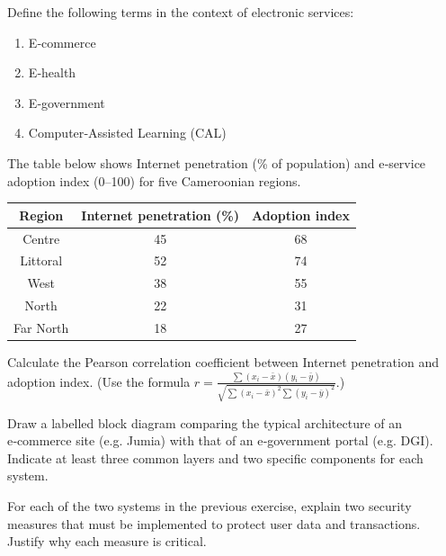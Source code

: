 \documentclass[11pt]{article}
\newcounter{popsec}
\newcounter{popsub}
\newcommand{\courssub}[1]{%
  \stepcounter{popsub}%
  \par\vspace{9pt}\noindent{\popxbold\fontsize{11.5}{13}\selectfont\color{popink}{\color{poporange}\thepopsec.\thepopsub}\hspace{6pt}#1}\par\nopagebreak\vspace{4pt}
}
\begin{document}
\begin{exercice}[Definitions]
Define the following terms in the context of electronic services:
\begin{enumerate}
\item E‑commerce
\item E‑health
\item E‑government
\item Computer‑Assisted Learning (CAL)
\end{enumerate}
\end{exercice}

\begin{exercice}
The table below shows Internet penetration (\% of population) and e‑service adoption index (0–100) for five Cameroonian regions.

\begin{center}
\begin{tabular}{|c|c|c|}\hline
Region & Internet penetration (\%) & Adoption index \\ \hline
Centre & 45 & 68 \\ \hline
Littoral & 52 & 74 \\ \hline
West & 38 & 55 \\ \hline
North & 22 & 31 \\ \hline
Far North & 18 & 27 \\ \hline
\end{tabular}
\end{center}

Calculate the Pearson correlation coefficient between Internet penetration and adoption index. (Use the formula $r = \frac{\sum (x_i-\bar{x})(y_i-\bar{y})}{\sqrt{\sum (x_i-\bar{x})^2 \sum (y_i-\bar{y})^2}}$.)
\end{exercice}

\courssub{I practise}

\begin{exercice}
Draw a labelled block diagram comparing the typical architecture of an e‑commerce site (e.g. Jumia) with that of an e‑government portal (e.g. DGI). Indicate at least three common layers and two specific components for each system.
\end{exercice}

\begin{exercice}
For each of the two systems in the previous exercise, explain two security measures that must be implemented to protect user data and transactions. Justify why each measure is critical.
\end{exercice}
\end{document}
